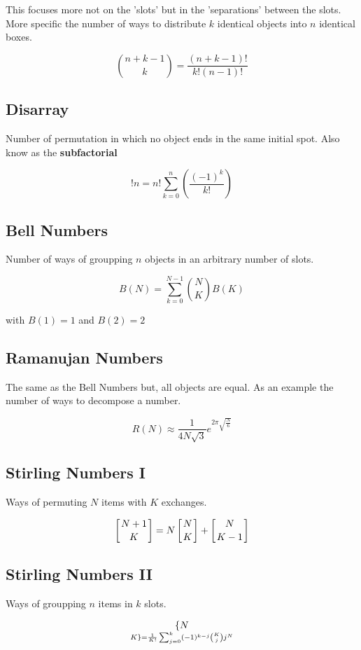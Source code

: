 This focuses more not on the 'slots' but in the 'separations' between the slots.
More specific the number of ways to distribute \(k\) identical objects into \(n\) identical boxes. 

\[\binom{n + k - 1}{k} = \frac{(n + k - 1)!}{k!(n - 1)!}\]

\subsection{Disarray}

Number of permutation in which no object ends in the same initial spot. Also know as the \textbf{subfactorial}

\[!n = n! \sum_{k = 0}^{n} \left(\frac{(-1)^k}{k!}\right)\]

\subsection{Bell Numbers}

Number of ways of groupping \(n\) objects in an arbitrary number of slots.

\[B(N) = \sum_{k = 0}^{N-1}\binom{N}{K}B(K)\]

with \(B(1) = 1\) and \(B(2) = 2\)

\subsection{Ramanujan Numbers}

The same as the Bell Numbers but, all objects are equal. As an example the number of ways
to decompose a number.

\[R(N) \approx \frac{1}{4N\sqrt{3}} e^{2\pi \sqrt{\frac{N}{6}}}\]

\subsection{Stirling Numbers I}

Ways of permuting \(N\) items with \(K\) exchanges.

\[ \left[ N + 1 \atop K\right] = N\left[N \atop K\right] + \left[N \atop K - 1\right]\] 

\subsection{Stirling Numbers II}

Ways of groupping \(n\) items in \(k\) slots.

\[ \{ N \atop K\} = \frac{1}{K!} \sum_{j=0}^{k}(-1)^{k - j}\binom{K}{j}j^N \]

